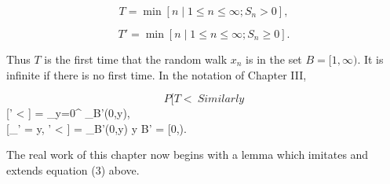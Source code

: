 $$T = \min [n \mid 1 \leq n \leq \infty; S_n > 0],$$

$$T' = \min [n \mid 1 \leq n \leq \infty; S_n \geq 0].$$

Thus $T$ is the first time that the random walk $x_n$ is in the set $B = [1,\infty)$. It is infinite if there is no first time. In the notation of Chapter III,

$$P[T < \

Similarly

$$[' < \infty] = \sum_{y=0}^{\infty} \Pi_{B'}(0,y),$$

$$[_{'} = y, ' < \infty] = \Pi_{B'}(0,y)  y   B' = [0,\infty).$$

The real work of this chapter now begins with a lemma which imitates and extends equation (3) above.